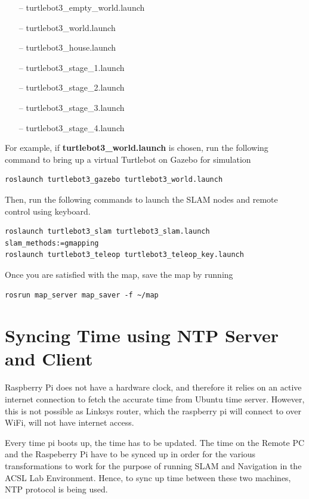 \documentclass[12]{article}
\begin{document}
\begin{itemize}
    \item[--] turtlebot3\_empty\_world.launch
    \item[--] turtlebot3\_world.launch
    \item[--] turtlebot3\_house.launch
    \item[--] turtlebot3\_stage\_1.launch
    \item[--] turtlebot3\_stage\_2.launch
    \item[--] turtlebot3\_stage\_3.launch 
    \item[--] turtlebot3\_stage\_4.launch
\end {itemize}
For example, if \textbf{turtlebot3\_world.launch} is chosen, run the following command to bring up a virtual Turtlebot on Gazebo for simulation
\begin{lstlisting}[style=bash]
roslaunch turtlebot3_gazebo turtlebot3_world.launch
\end{lstlisting}
\newpage
Then, run the following commands to launch the SLAM nodes and remote control using keyboard. 
\begin{lstlisting}[style=bash]
roslaunch turtlebot3_slam turtlebot3_slam.launch slam_methods:=gmapping
roslaunch turtlebot3_teleop turtlebot3_teleop_key.launch
\end{lstlisting}
Once you are satisfied with the map, save the map by running
\begin{lstlisting}[style=bash]
rosrun map_server map_saver -f ~/map
\end{lstlisting}

\section{Syncing Time using NTP Server and Client}

Raspberry Pi does not have a hardware clock, and therefore it relies on an active internet connection to fetch the accurate time from Ubuntu time server. However, this is not possible as Linksys router, which the raspberry pi will connect to over WiFi, will not have internet access.

Every time pi boots up, the time has to be updated. The time on the Remote PC and the Raspeberry Pi have to be synced up in order for the various transformations to work for the purpose of running SLAM and Navigation in the ACSL Lab Environment. Hence, to sync up time between these two machines, NTP protocol is being used.
\end{document}
